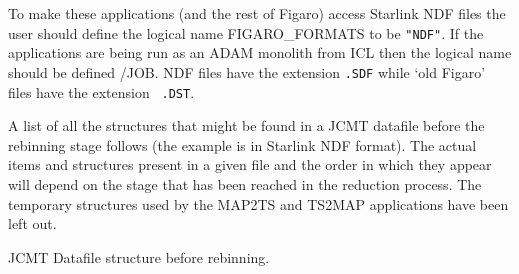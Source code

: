 To make these applications (and the rest of Figaro) access Starlink
NDF files the user should define the logical name FIGARO\_FORMATS to
be {\tt  "NDF"}. If the applications are being run as an ADAM monolith from
ICL then the logical name should be defined /JOB. NDF files have the
extension {\tt .SDF} while `old Figaro' files have the extension {\tt
.DST}.

A list of all the structures that might be found in a JCMT datafile
before the rebinning stage follows (the example is in Starlink NDF
format).  The actual items and  structures present in a given file and
the order in which they appear will depend on the stage that has been
reached in the reduction process. The temporary structures used by the
MAP2TS and TS2MAP applications  have been left out.

\newpage    %

JCMT Datafile structure before rebinning.

